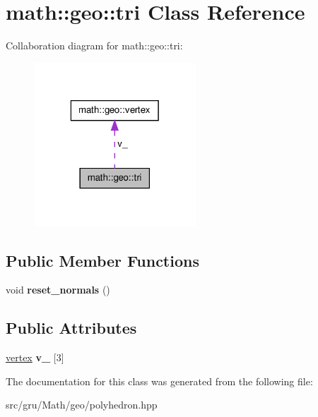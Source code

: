 \hypertarget{classmath_1_1geo_1_1tri}{\section{math\-:\-:geo\-:\-:tri \-Class \-Reference}
\label{classmath_1_1geo_1_1tri}
}


\-Collaboration diagram for math\-:\-:geo\-:\-:tri\-:
\nopagebreak
\begin{figure}[H]
\begin{center}
\leavevmode
\includegraphics[width=172pt]{classmath_1_1geo_1_1tri__coll__graph}
\end{center}
\end{figure}
\subsection*{\-Public \-Member \-Functions}
\begin{DoxyCompactItemize}
\item 
\hypertarget{classmath_1_1geo_1_1tri_a9781ddeac1d6e0795ede6818f1ca52b8}{void {\bfseries reset\-\_\-normals} ()}\label{classmath_1_1geo_1_1tri_a9781ddeac1d6e0795ede6818f1ca52b8}

\end{DoxyCompactItemize}
\subsection*{\-Public \-Attributes}
\begin{DoxyCompactItemize}
\item 
\hypertarget{classmath_1_1geo_1_1tri_a1578bb4ca85d7adabc44b48e1fbbbe29}{\hyperlink{classmath_1_1geo_1_1vertex}{vertex} {\bfseries v\-\_\-} \mbox{[}3\mbox{]}}\label{classmath_1_1geo_1_1tri_a1578bb4ca85d7adabc44b48e1fbbbe29}

\end{DoxyCompactItemize}


\-The documentation for this class was generated from the following file\-:\begin{DoxyCompactItemize}
\item 
src/gru/\-Math/geo/polyhedron.\-hpp\end{DoxyCompactItemize}
